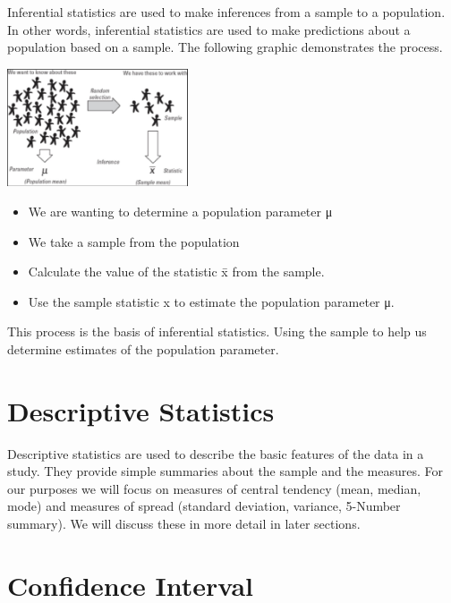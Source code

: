 \documentclass[
  letterpaper,
  DIV=11,
  numbers=noendperiod]{scrreprt}
\providecommand{\tightlist}{%
  \setlength{\itemsep}{0pt}\setlength{\parskip}{0pt}}\usepackage{longtable,booktabs,array}
\begin{document}

Inferential statistics are used to make inferences from a sample to a
population. In other words, inferential statistics are used to make
predictions about a population based on a sample. The following graphic
demonstrates the process.

\includegraphics[width=0.4\textwidth,height=\textheight]{./images/SL_1.jpg}

\begin{itemize}
\tightlist
\item
  We are wanting to determine a population parameter μ
\item
  We take a sample from the population
\item
  Calculate the value of the statistic x̄ from the sample.
\item
  Use the sample statistic x to estimate the population parameter μ.
\end{itemize}

This process is the basis of inferential statistics. Using the sample to
help us determine estimates of the population parameter.

\section*{Descriptive Statistics}\label{descriptive-statistics}


Descriptive statistics are used to describe the basic features of the
data in a study. They provide simple summaries about the sample and the
measures. For our purposes we will focus on measures of central tendency
(mean, median, mode) and measures of spread (standard deviation,
variance, 5-Number summary). We will discuss these in more detail in
later sections.

\section*{Confidence Interval}\label{confidence-interval}
\end{document}
